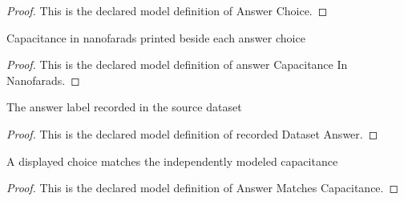 \begin{proof}
  This is the declared model definition of Answer Choice.
\end{proof}
\begin{definition}
  \label{def:physics:phyx-mini-0873:phyxminiproblems-problemphyxmini0873-answercapacitanceinnanofarads}
  Capacitance in nanofarads printed beside each answer choice
\end{definition}
\begin{proof}
  This is the declared model definition of answer Capacitance In Nanofarads.
\end{proof}
\begin{definition}
  \label{def:physics:phyx-mini-0873:phyxminiproblems-problemphyxmini0873-recordeddatasetanswer}
  The answer label recorded in the source dataset
\end{definition}
\begin{proof}
  This is the declared model definition of recorded Dataset Answer.
\end{proof}
\begin{definition}
  \label{def:physics:phyx-mini-0873:phyxminiproblems-problemphyxmini0873-answermatchescapacitance}
  A displayed choice matches the independently modeled capacitance
\end{definition}
\begin{proof}
  This is the declared model definition of Answer Matches Capacitance.
\end{proof}
